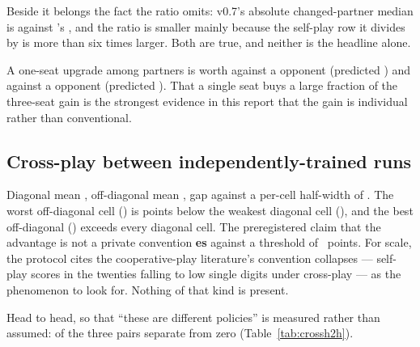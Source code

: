 Beside it belongs the fact the ratio omits: v0.7's absolute changed-partner median is
\vsevenSoneMedian{} against \vsix{}'s \vsevenBaseMedian{}, and the ratio is smaller mainly because the
self-play row it divides by is more than six times larger. Both are true, and neither is the headline
alone.

A one-seat upgrade among \vsix{} partners is worth \vsevenOneSeatFive{} against a \vfive{} opponent
(predicted \vsevenTrainOneSeatFive{}) and \vsevenOneSeatSix{} against a \vsix{} opponent (predicted
\vsevenTrainOneSeatSix{}). That a single seat buys a large fraction of the three-seat gain is the
strongest evidence in this report that the gain is individual rather than conventional.

\subsection{Cross-play between independently-trained runs}
\label{sec:results-crossplay}

\begin{table}[t]\centering
\caption{Cross-play. Three runs of the frozen architecture, independently trained on disjoint fitting
banks with different search trajectories and, for one, a different starting basin; pairwise parameter
distance \vsevenXpDistanceLo{}--\vsevenXpDistanceHi{} over \vsevenCoordinates{} coordinates.}
\label{tab:crossplay}
{\small}
\end{table}

Diagonal mean \vsevenXpDiagonal{}, off-diagonal mean \vsevenXpOffDiagonal{}, gap
\vsevenXpGap{} against a per-cell half-width of \vsevenXpHalfWidth{}. The worst off-diagonal cell
(\vsevenXpWorstOff{}) is \vsevenXpWorstOffShortfall{} points below the weakest diagonal cell
(\vsevenXpWeakestDiag{}), and the best off-diagonal (\vsevenXpBestOff{}) exceeds every diagonal
cell. The preregistered claim that the advantage is not a
private convention \textbf{\vsevenStwoVerdict{}es} against a threshold of
\vsevenStwoThreshold{}~points. For scale, the protocol cites the cooperative-play literature's
convention collapses --- self-play scores in the twenties falling to low single digits under
cross-play --- as the phenomenon to look for. Nothing of that kind is present.

Head to head, so that ``these are different policies'' is measured rather than assumed:
\vsevenHtwohSeparated{} of the three pairs separate from zero (Table~\ref{tab:crossh2h}).

